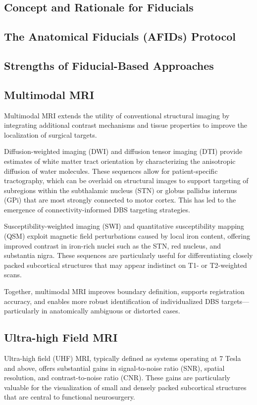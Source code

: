 \subsection{Concept and Rationale for Fiducials}
\subsection{The Anatomical Fiducials (AFIDs) Protocol}
\subsection{Strengths of Fiducial-Based Approaches}


\subsection{Multimodal MRI}
Multimodal MRI extends the utility of conventional structural imaging by integrating additional contrast mechanisms and tissue properties to improve the localization of surgical targets.

Diffusion-weighted imaging (DWI) and diffusion tensor imaging (DTI) provide estimates of white matter tract orientation by characterizing the anisotropic diffusion of water molecules. These sequences allow for patient-specific tractography, which can be overlaid on structural images to support targeting of subregions within the subthalamic nucleus (STN) or globus pallidus internus (GPi) that are most strongly connected to motor cortex. This has led to the emergence of connectivity-informed DBS targeting strategies.

Susceptibility-weighted imaging (SWI) and quantitative susceptibility mapping (QSM) exploit magnetic field perturbations caused by local iron content, offering improved contrast in iron-rich nuclei such as the STN, red nucleus, and substantia nigra. These sequences are particularly useful for differentiating closely packed subcortical structures that may appear indistinct on T1- or T2-weighted scans.

Together, multimodal MRI improves boundary definition, supports registration accuracy, and enables more robust identification of individualized DBS targets—particularly in anatomically ambiguous or distorted cases.

\subsection{Ultra-high Field MRI}
Ultra-high field (UHF) MRI, typically defined as systems operating at 7 Tesla and above, offers substantial gains in signal-to-noise ratio (SNR), spatial resolution, and contrast-to-noise ratio (CNR). These gains are particularly valuable for the visualization of small and densely packed subcortical structures that are central to functional neurosurgery.

